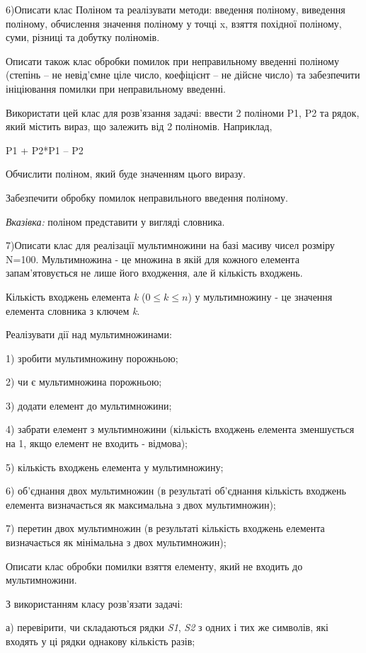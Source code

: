\documentclass[]{article}
\begin{document}
6)Описати клас Поліном та реалізувати методи: введення поліному,
виведення поліному, обчислення значення поліному у точці x, взяття
похідної поліному, суми, різниці та добутку поліномів.

Описати також клас обробки помилок при неправильному введенні поліному
(степінь -- не невід'ємне ціле число, коефіцієнт -- не дійсне число) та
забезпечити ініціювання помилки при неправильному введенні.

Використати цей клас для розв'язання задачі: ввести 2 поліноми P1, P2 та
рядок, який містить вираз, що залежить від 2 поліномів. Наприклад,

P1 + P2*P1 -- P2

Обчислити поліном, який буде значенням цього виразу.

Забезпечити обробку помилок неправильного введення поліному.

\emph{\emph{Вказівка:}} поліном представити у вигляді словника.

7)Описати клас для реалізації мультимножини на базі масиву чисел розміру
N=100. Мультимножина - це множина в якій для кожного елемента
запам'ятовується не лише його входження, але й кількість входжень.

Кількість входжень елемента \emph{k} (\(0 \leq k \leq n\)) у
мультимножину - це значення елемента словника з ключем \emph{k}.

Реалізувати дії над мультимножинами:

1) зробити мультимножину порожньою;

2) чи є мультимножина порожньою;

3) додати елемент до мультимножини;

4) забрати елемент з мультимножини (кількість входжень елемента
зменшується на 1, якщо елемент не входить - відмова);

5) кількість входжень елемента у мультимножину;

6) об'єднання двох мультимножин (в результаті об'єднання кількість
входжень елемента визначається як максимальна з двох мультимножин);

7) перетин двох мультимножин (в результаті кількість входжень елемента
визначається як мінімальна з двох мультимножин);

Описати клас обробки помилки взяття елементу, який не входить до
мультимножини.

З використанням класу розв'язати задачі:

а) перевірити, чи складаються рядки \emph{S1}, \emph{S2} з одних і тих
же символів, які входять у ці рядки однакову кількість разів;
\end{document}
